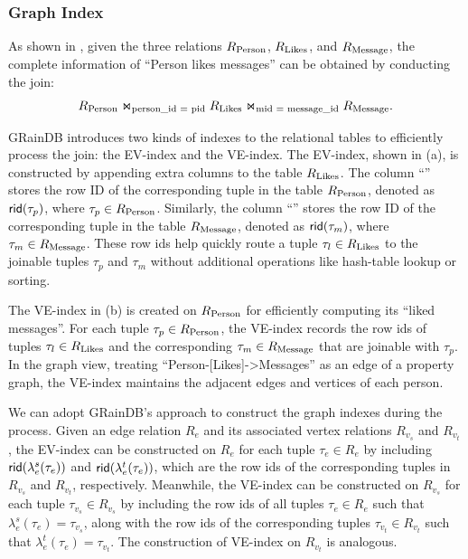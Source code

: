 \subsubsection{Graph Index}
\label{sec:graph-index}

As shown in , given the three relations ${R_{\text{Person}}}$, ${R_{\text{Likes}}}$, and ${R_{\text{Message}}}$, the complete information of ``Person likes messages'' can be obtained by conducting the join:
\[ {R_{\text{Person}}} \Join_\text{person\_id = pid} {\ensuremath R_{\text{Likes}}} \Join_\text{mid = message\_id} {\ensuremath R_{\text{Message}}}. \]


GRainDB introduces two kinds of indexes to the relational tables to efficiently process the join: the EV-index and the VE-index. The EV-index, shown in (a), is constructed by appending extra columns to the table ${R_{\text{Likes}}}$. The column ``'' stores the row ID of the corresponding tuple in the table ${R_{\text{Person}}}$, denoted as ${\mathsf{rid}}(\tau_{p})$, where $\tau_{p} \in {\ensuremath R_{\text{Person}}}$. Similarly, the column ``'' stores the row ID of the corresponding tuple in the table ${R_{\text{Message}}}$, denoted as ${\mathsf{rid}}(\tau_{m})$, where $\tau_{m} \in {\ensuremath R_{\text{Message}}}$. These row ids help quickly route a tuple $\tau_{l} \in {\ensuremath R_{\text{Likes}}}$ to the joinable tuples $\tau_{p}$ and $\tau_{m}$ without additional operations like hash-table lookup or sorting.

The VE-index in (b) is created on ${R_{\text{Person}}}$ for efficiently computing its ``liked messages''. For each tuple $\tau_{p} \in {\ensuremath R_{\text{Person}}}$, the VE-index records the row ids of tuples $\tau_{l} \in {\ensuremath R_{\text{Likes}}}$ and the corresponding $\tau_{m} \in {\ensuremath R_{\text{Message}}}$ that are joinable with $\tau_{p}$. In the graph view, treating ``Person-[Likes]->Messages'' as an edge of a property graph, the VE-index maintains the adjacent edges and vertices of each person.

We can adopt GRainDB's approach to construct the graph indexes during the \rgmapping process. Given an edge relation $R_e$ and its associated vertex relations $R_{v_s}$ and $R_{v_t}$, the EV-index can be constructed on $R_e$ for each tuple $\tau_e \in R_e$ by including ${\mathsf{rid}}(\lambda_e^s(\tau_e))$ and ${\mathsf{rid}}(\lambda_e^t(\tau_e))$, which are the row ids of the corresponding tuples in $R_{v_s}$ and $R_{v_t}$, respectively. Meanwhile, the VE-index can be constructed on $R_{v_s}$ for each tuple $\tau_{v_s} \in R_{v_s}$ by including the row ids of all tuples $\tau_e \in R_e$ such that $\lambda_e^s(\tau_e) = \tau_{v_s}$, along with the row ids of the corresponding tuples $\tau_{v_t} \in R_{v_t}$ such that $\lambda_e^t(\tau_e) = \tau_{v_t}$.
The construction of VE-index on $R_{v_t}$ is analogous.

